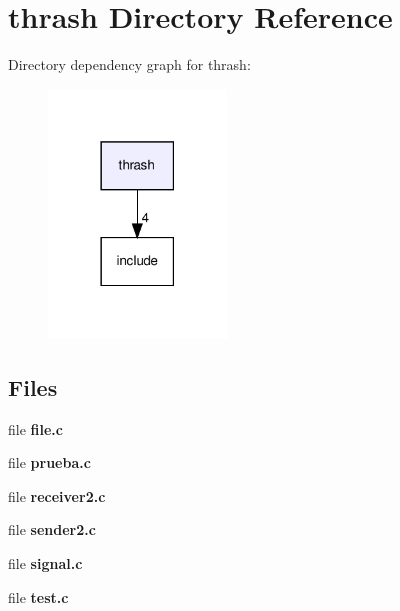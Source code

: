 \section{thrash Directory Reference}
\label{dir_c379293c836f304268e92f9c3073abed}
Directory dependency graph for thrash\+:
\nopagebreak
\begin{figure}[H]
\begin{center}
\leavevmode
\includegraphics[width=134pt]{dir_c379293c836f304268e92f9c3073abed_dep}
\end{center}
\end{figure}
\subsection*{Files}
\begin{DoxyCompactItemize}
\item 
file \textbf{ file.\+c}
\item 
file \textbf{ prueba.\+c}
\item 
file \textbf{ receiver2.\+c}
\item 
file \textbf{ sender2.\+c}
\item 
file \textbf{ signal.\+c}
\item 
file \textbf{ test.\+c}
\end{DoxyCompactItemize}
